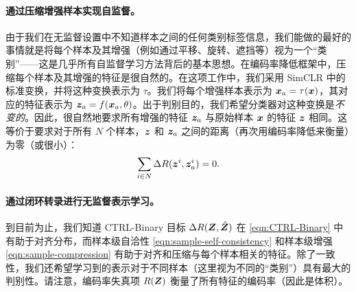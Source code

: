 \documentclass[../../book-main.tex]{subfiles}
\begin{document}
\paragraph{通过压缩增强样本实现自监督。} 
由于我们在无监督设置中不知道样本之间的任何类别标签信息，我们能做的最好的事情就是将每个样本及其增强（例如通过平移、旋转、遮挡等）视为一个“类别”——这是几乎所有自监督学习方法背后的基本思想。在编码率降低框架中，压缩每个样本及其增强的特征是很自然的。在这项工作中，我们采用 SimCLR \cite{chen2020simple} 中的标准变换，并将这种变换表示为 $\tau$。我们将每个增强样本表示为 $\bm{x}_a = \tau(\bm{x})$，其对应的特征表示为 $\bm{z}_a = f(\bm{x}_a, \theta)$。出于判别目的，我们希望分类器对这种变换是{\em 不变的}。因此，很自然地要求所有增强的特征 $\bm{z}_a$ 与原始样本 $\bm{x}$ 的特征 $\bm{z}$ 相同。这等价于要求对于所有 $N$ 个样本，$\bm{z}$ 和 $\bm{z}_a$ 之间的距离（再次用编码率降低来衡量）为零（或很小）：
\begin{align}
\sum_{i\in N} \Delta R(\z^i,\z_{a}^i) = 0.
\label{eqn:sample-compression}\vspace{-3mm}
\end{align}


\paragraph{通过闭环转录进行无监督表示学习。} 
到目前为止，我们知道 CTRL-Binary 目标 $\Delta R(\bm{Z}, \hat{\bm{Z}})$ 在 \eqref{eqn:CTRL-Binary} 中有助于对齐分布，而样本级自洽性 \eqref{eqn:sample-self-consistency} 和样本级增强 \eqref{eqn:sample-compression} 有助于对齐和压缩与每个样本相关的特征。除了一致性，我们还希望学习到的表示对于不同样本（这里视为不同的“类别”）具有最大的判别性。请注意，编码率失真项 $R(\bm{Z})$ 衡量了所有特征的编码率（因此是体积）。%
\end{document}
